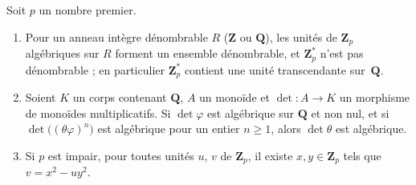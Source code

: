 \begin{encadre}
\begin{enonce}
Soit $p$ un nombre premier.
\begin{enumerate}
\item Pour un anneau intègre dénombrable $R$ ($\mathbf Z$ ou $\mathbf Q$), les unités de $\mathbf Z_p$ algébriques sur $R$ forment un ensemble dénombrable, et $\mathbf Z_p^*$ n'est pas dénombrable ; en particulier $\mathbf Z_p^*$ contient une unité transcendante sur~$\mathbf Q$.
\item Soient $K$ un corps contenant $\mathbf Q$, $A$ un monoïde et $\det : A \to K$ un morphisme de monoïdes multiplicatifs. Si $\det\varphi$ est algébrique sur $\mathbf Q$ et non nul, et si $\det\bigl((\theta\varphi)^n\bigr)$ est algébrique pour un entier $n \geq 1$, alors $\det\theta$ est algébrique.
\item Si $p$ est impair, pour toutes unités $u$, $v$ de $\mathbf Z_p$, il existe $x, y \in \mathbf Z_p$ tels que $v = x^2 - u y^2$.
\end{enumerate}
\end{enonce}
\end{encadre}
